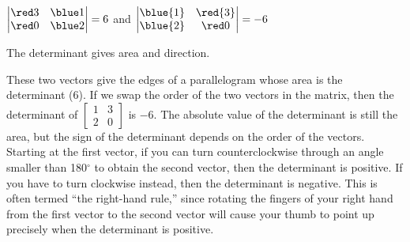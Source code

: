 {{{\vspace{2pt}
$\begin{vmatrix}{\red 3}&{\blue 1}\\{\red 0}&{\blue 2}\end{vmatrix}=6$ and $\begin{vmatrix}\blue{1}&\red{3}\\\blue{2}&\red0\end{vmatrix}=-6$

   The determinant gives area and direction.
    }}
These two vectors give the edges of a parallelogram whose area is the determinant ($6$).  If we swap the order of the two vectors in the matrix, then the determinant of $\begin{bmatrix}1&3\\2&0\end{bmatrix}$ is $-6$.  The absolute value of the determinant is still the area, but the sign of the determinant depends on the order of the vectors. Starting at the first vector, if you can turn counterclockwise through an angle smaller than 180$^\circ$ to obtain the second vector, then the determinant is positive.  If you have to turn clockwise instead, then the determinant is negative.  This is often termed ``the right-hand rule,'' since rotating the fingers of your right hand from the first vector to the second vector will cause your thumb to point up precisely when the determinant is positive.

}
